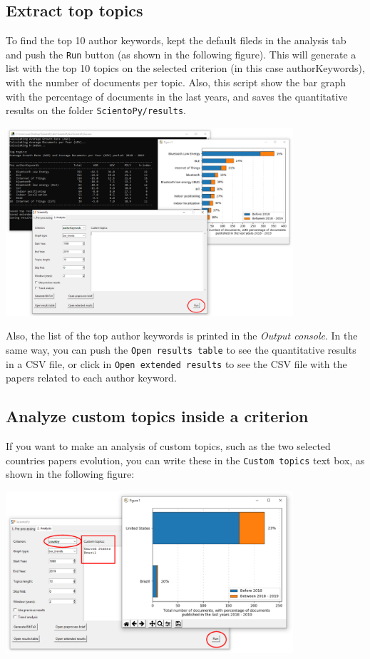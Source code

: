 \documentclass[10pt,letterpaper]{article}
\begin{document}
\subsection{Extract top topics}

To find the top 10 author keywords, kept the default fileds in the analysis tab and push the \verb|Run| button (as shown in the following figure). This will generate a list with the top 10 topics on the selected criterion (in this case authorKeywords), with the number of documents per topic. Also, this script show the bar graph with the percentage of documents in the last years, and saves the quantitative results on the folder \verb|ScientoPy/results|. 

\begin{center}
	\includegraphics[width=0.8\textwidth]{./figures/win_analysis2.eps}
\end{center}

Also, the list of the top author keywords is printed in the \textit{Output console}. In the same way, you can push the \verb|Open results table| to see the quantitative results in a CSV file, or click in \verb|Open extended results| to see the CSV file with the papers related to each author keyword. 

\subsection{Analyze custom topics inside a criterion}

If you want to make an analysis of custom topics, such as the two selected countries papers evolution, you can write these in the \verb|Custom topics| text box, as shown in the following figure:

\begin{center}
	\includegraphics[width=0.8\textwidth]{./figures/win_analysis3.eps}
\end{center}
\end{document}
